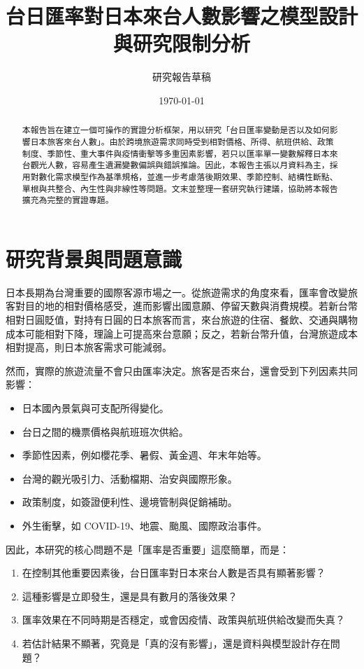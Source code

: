 \documentclass[12pt,a4paper,fontset=none]{ctexart}
\title{台日匯率對日本來台人數影響之模型設計\\與研究限制分析}
\author{研究報告草稿}
\date{\today}
\begin{document}
\maketitle

\begin{abstract}
本報告旨在建立一個可操作的實證分析框架，用以研究「台日匯率變動是否以及如何影響日本旅客來台人數」。由於跨境旅遊需求同時受到相對價格、所得、航班供給、政策制度、季節性、重大事件與疫情衝擊等多重因素影響，若只以匯率單一變數解釋日本來台觀光人數，容易產生遺漏變數偏誤與錯誤推論。因此，本報告主張以月資料為主，採用對數化需求模型作為基準規格，並進一步考慮落後期效果、季節控制、結構性斷點、單根與共整合、內生性與非線性等問題。文末並整理一套研究執行建議，協助將本報告擴充為完整的實證專題。
\end{abstract}

\section{研究背景與問題意識}

日本長期為台灣重要的國際客源市場之一。從旅遊需求的角度來看，匯率會改變旅客對目的地的相對價格感受，進而影響出國意願、停留天數與消費規模。若新台幣相對日圓貶值，對持有日圓的日本旅客而言，來台旅遊的住宿、餐飲、交通與購物成本可能相對下降，理論上可提高來台意願；反之，若新台幣升值，台灣旅遊成本相對提高，則日本旅客需求可能減弱。

然而，實際的旅遊流量不會只由匯率決定。旅客是否來台，還會受到下列因素共同影響：

\begin{itemize}
  \item 日本國內景氣與可支配所得變化。
  \item 台日之間的機票價格與航班班次供給。
  \item 季節性因素，例如櫻花季、暑假、黃金週、年末年始等。
  \item 台灣的觀光吸引力、活動檔期、治安與國際形象。
  \item 政策制度，如簽證便利性、邊境管制與促銷補助。
  \item 外生衝擊，如 COVID-19、地震、颱風、國際政治事件。
\end{itemize}

因此，本研究的核心問題不是「匯率是否重要」這麼簡單，而是：

\begin{enumerate}
  \item 在控制其他重要因素後，台日匯率對日本來台人數是否具有顯著影響？
  \item 這種影響是立即發生，還是具有數月的落後效果？
  \item 匯率效果在不同時期是否穩定，或會因疫情、政策與航班供給改變而失真？
  \item 若估計結果不顯著，究竟是「真的沒有影響」，還是資料與模型設計存在問題？
\end{enumerate}
\end{document}
